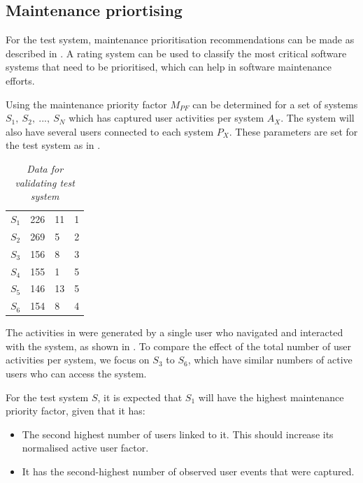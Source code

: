 \subsection{Maintenance priortising}
For the test system, maintenance prioritisation recommendations can be made as described in . A rating system can be used to classify the most critical software systems that need to be prioritised, which can help in software maintenance efforts.\par Using  the maintenance priority factor $M_{PF}$ can be determined for a set of systems {$S_1,~S_2,~...,~S_N$} which has captured user activities per system $A_X$. The system will also have several users connected to each system $P_X$. These parameters are set for the test system as in .

\begin{table}[!htb]
	\centering
	\caption[Data for validating test system]
	{\textit{Data for validating test system}}
	\label{tbl:ch3_testData}
	\begin{tabularx}{\textwidth}{XXXX}
		\toprule
		\thead{System ($S_X$)} & \thead{Users per system ($P_X$)} & \thead{Number of events ($A_X$)} & \thead{Expected priority} \\
		\midrule
		\rowcolor{lightgray}
		$S_1$ & 226 & 11 & 1 \\
		$S_2$ & 269 & 5 & 2 \\
		\rowcolor{lightgray}
		$S_3$ & 156 & 8 & 3 \\
		$S_4$ & 155 & 1 & 5 \\
		\rowcolor{lightgray}
		$S_5$ & 146 & 13 & 5 \\
		$S_6$ & 154 & 8 & 4 \\
		\bottomrule
	\end{tabularx}
\end{table}

The activities in  were generated by a single user who navigated and interacted with the system, as shown in . To compare the effect of the total number of user activities per system, we focus on $S_3$ to $S_6$, which have similar numbers of active users who can access the system.\par For the test system $S$, it is expected that $S_1$ will have the highest maintenance priority factor, given that it has:

\begin{itemize}
	\item The second highest number of users linked to it. This should increase its normalised active user factor.
	\item It has the second-highest number of observed user events that were captured.
\end{itemize}

